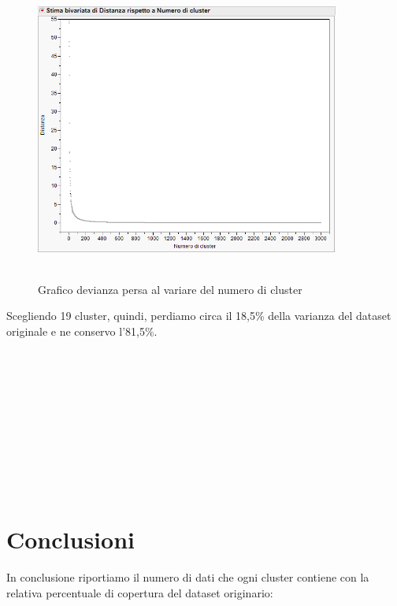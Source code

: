 \begin{figure}[!h]
	\centering
	\includegraphics[width=10cm, height=10cm]{./immagine/grafico.png}
	\caption{Grafico devianza persa al variare del numero di cluster}
	\label{fig:grafico}
\end{figure} 

Scegliendo 19 cluster, quindi, perdiamo circa il 18,5\% della varianza del dataset originale e ne conservo l'81,5\%.\\\\\\\\\\\\\\\\\\\\\\

\section{Conclusioni}
In conclusione riportiamo il numero di dati che ogni cluster contiene con la relativa percentuale di copertura del dataset originario:\\

